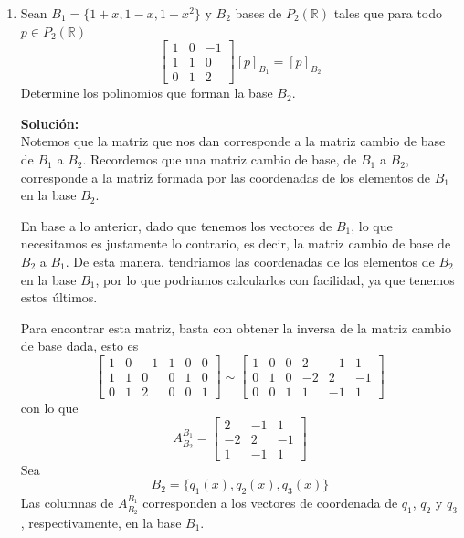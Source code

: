 \documentclass[12pt]{article}
\newenvironment{solucion}
{\begin{mdframed}[backgroundcolor=black!10]
		{\bf Solución:}\\
	}
	{
	\end{mdframed}
}
\newenvironment{preguntas}
{\begin{enumerate}\itemsep12pt
	}
	{
	\end{enumerate}
}
\newcommand{\R}{\mathbb{R}}
\begin{document}
\begin{preguntas}
\item Sean $B_1 = \{1+x,1-x,1+x^2\}$ y $B_2$ bases de $P_2(\R)$ tales que para todo $p \in P_2(\R)$
	$$ \begin{bmatrix}
	1 & 0 & -1\\
	1 & 1 & 0 \\
	0 & 1 & 2
	\end{bmatrix} [p]_{B_1} = [p]_{B_2}$$
	Determine los polinomios que forman la base $B_2$.
\begin{solucion}
Notemos que la matriz que nos dan corresponde a la matriz cambio de base de $B_1$ a $B_2$. Recordemos que una matriz cambio de base, de $B_1$ a $B_2$, corresponde a la matriz formada por las coordenadas de los elementos de $B_1$ en la base $B_2$.
		
		En base a lo anterior, dado que tenemos los vectores de $B_1$, lo que necesitamos es justamente lo contrario, es decir, la matriz cambio de base de $B_2$ a $B_1$. De esta manera, tendriamos las coordenadas de los elementos de $B_2$ en la base $B_1$, por lo que podriamos calcularlos con facilidad, ya que tenemos estos últimos.
		
		Para encontrar esta matriz, basta con obtener la inversa de la matriz cambio de base dada, esto es
		$$ \left[\begin{array}{ccc|ccc}
		1 & 0 & -1 & 1 & 0 & 0\\
		1 & 1 & 0 & 0 & 1 & 0\\
		0 & 1 & 2 & 0 & 0 & 1
		\end{array}\right] \sim 
		\left[\begin{array}{ccc|ccc}
		1 & 0 & 0 & 2 & -1 & 1\\
		0 & 1 & 0 & -2 & 2 & -1\\
		0 & 0 & 1 & 1 & -1 & 1
		\end{array}\right]$$
		con lo que
		$$A_{B_2}^{B_1} = \begin{bmatrix}
		2 & -1 & 1\\
		-2 & 2 & -1\\
		1 & -1 & 1
		\end{bmatrix}$$
		Sea 
		$$B_2 = \{q_1(x), q_2(x), q_3(x)\}$$
		Las columnas de $A_{B_2}^{B_1}$ corresponden a los vectores de coordenada de $q_1$, $q_2$ y $q_3$, respectivamente, en la base $B_1$.
		

\end{solucion}
\end{preguntas}
\end{document}
